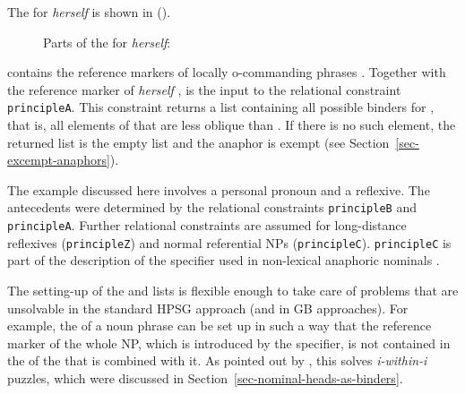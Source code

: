 \documentclass[output=paper,biblatex,babelshorthands,newtxmath,draftmode,colorlinks,citecolor=brown]{langscibook}
\begin{document}
The \synsemv for \emph{herself} is shown in ().
\begin{figure}
\ea
Parts of the \synsemv for \emph{herself}:\\
\z
\vspace{-1.5\baselineskip}
\end{figure}
\lista contains the reference markers of locally o-commanding phrases . Together with the
reference marker of \emph{herself} ,  is the input to the relational constraint
\texttt{principleA}. This constraint returns a list containing all possible binders for ,
that is, all elements of  that are less oblique than . If there is no such element,
the returned list is the empty list and the anaphor is exempt (see Section~\ref{sec-excempt-anaphors}).

The example discussed here involves a personal pronoun and a reflexive. The antecedents were
determined by the relational constraints \texttt{principleB} and \texttt{prin\-cipleA}. Further
relational constraints are assumed for long-distance reflexives (\texttt{principleZ}) and normal
referential NPs (\texttt{principleC}). \texttt{principleC} is part of the description of the
specifier used in non-lexical anaphoric nominals \citep[]{Branco2002a}.

The setting-up of the \lista and \listu lists is flexible enough to take care of problems that are
unsolvable in the standard HPSG approach (and in GB approaches). For example, the \listul of a noun
phrase can be set up in such a way that the reference marker of the whole NP, which is introduced by
the specifier, is not contained in the \listul of the \nbar that is combined with it. As pointed out
by \citet[]{Branco2002a}, this solves \emph{i-within-i} puzzles, which were discussed in Section~\ref{sec-nominal-heads-as-binders}.
\end{document}
